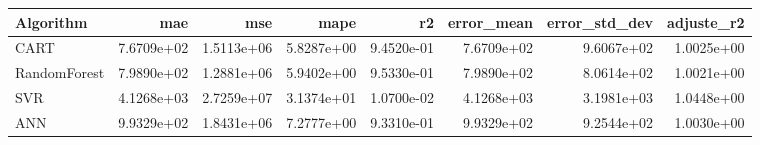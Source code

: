 \begin{tabular}{lrrrrrrr}
\toprule
Algorithm & mae & mse & mape & r2 & error_mean & error_std_dev & adjuste_r2 \\
\midrule
CART & 7.6709e+02 & 1.5113e+06 & 5.8287e+00 & 9.4520e-01 & 7.6709e+02 & 9.6067e+02 & 1.0025e+00 \\
RandomForest & 7.9890e+02 & 1.2881e+06 & 5.9402e+00 & 9.5330e-01 & 7.9890e+02 & 8.0614e+02 & 1.0021e+00 \\
SVR & 4.1268e+03 & 2.7259e+07 & 3.1374e+01 & 1.0700e-02 & 4.1268e+03 & 3.1981e+03 & 1.0448e+00 \\
ANN & 9.9329e+02 & 1.8431e+06 & 7.2777e+00 & 9.3310e-01 & 9.9329e+02 & 9.2544e+02 & 1.0030e+00 \\
\bottomrule
\end{tabular}
